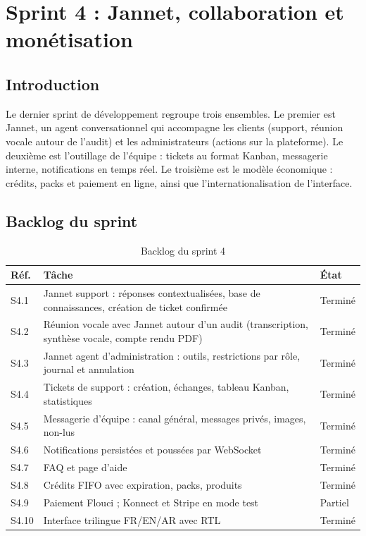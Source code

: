 \chapter{Sprint 4 : Jannet, collaboration et monétisation}

\section{Introduction}
Le dernier sprint de développement regroupe trois ensembles. Le premier est Jannet, un agent conversationnel qui accompagne les clients (support, réunion vocale autour de l'audit) et les administrateurs (actions sur la plateforme). Le deuxième est l'outillage de l'équipe : tickets au format Kanban, messagerie interne, notifications en temps réel. Le troisième est le modèle économique : crédits, packs et paiement en ligne, ainsi que l'internationalisation de l'interface.

\section{Backlog du sprint}
\begin{table}[htbp]
\centering
\small
\caption{Backlog du sprint 4}\label{tab-backlog-s4}
\begin{tabularx}{\textwidth}{@{}lXl@{}}
\toprule
\textbf{Réf.} & \textbf{Tâche} & \textbf{État}\\
\midrule
S4.1 & Jannet support : réponses contextualisées, base de connaissances, création de ticket confirmée & Terminé\\
S4.2 & Réunion vocale avec Jannet autour d'un audit (transcription, synthèse vocale, compte rendu PDF) & Terminé\\
S4.3 & Jannet agent d'administration : outils, restrictions par rôle, journal et annulation & Terminé\\
S4.4 & Tickets de support : création, échanges, tableau Kanban, statistiques & Terminé\\
S4.5 & Messagerie d'équipe : canal général, messages privés, images, non-lus & Terminé\\
S4.6 & Notifications persistées et poussées par WebSocket & Terminé\\
S4.7 & FAQ et page d'aide & Terminé\\
S4.8 & Crédits FIFO avec expiration, packs, produits & Terminé\\
S4.9 & Paiement Flouci ; Konnect et Stripe en mode test & Partiel\\
S4.10 & Interface trilingue FR/EN/AR avec RTL & Terminé\\
\bottomrule
\end{tabularx}
\end{table}

